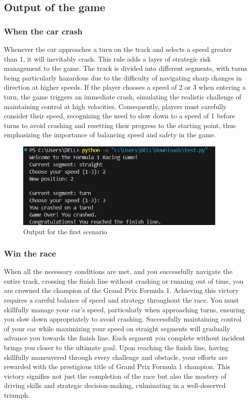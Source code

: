 \documentclass[12pt]{article}
\begin{document}
\subsection{Output of the game}
\subsubsection{When the car crash}
Whenever the car approaches a turn on the track and selects a speed greater than 1, it will inevitably crash. This rule adds a layer of strategic risk management to the game. The track is divided into different segments, with turns being particularly hazardous due to the difficulty of navigating sharp changes in direction at higher speeds. If the player chooses a speed of 2 or 3 when entering a turn, the game triggers an immediate crash, simulating the realistic challenge of maintaining control at high velocities. Consequently, players must carefully consider their speed, recognizing the need to slow down to a speed of 1 before turns to avoid crashing and resetting their progress to the starting point, thus emphasizing the importance of balancing speed and safety in the game.

\begin{figure}[h!]
\begin{center}
\includegraphics[width=10.5cm]{output1.png}\\
Output for the first scenario
\end{center}
\end{figure}

\subsubsection{Win the race}
When all the necessary conditions are met, and you successfully navigate the entire track, crossing the finish line without crashing or running out of time, you are crowned the champion of the Grand Prix Formula 1. Achieving this victory requires a careful balance of speed and strategy throughout the race. You must skillfully manage your car's speed, particularly when approaching turns, ensuring you slow down appropriately to avoid crashing. Successfully maintaining control of your car while maximizing your speed on straight segments will gradually advance you towards the finish line. Each segment you complete without incident brings you closer to the ultimate goal. Upon reaching the finish line, having skillfully maneuvered through every challenge and obstacle, your efforts are rewarded with the prestigious title of Grand Prix Formula 1 champion. This victory signifies not just the completion of the race but also the mastery of driving skills and strategic decision-making, culminating in a well-deserved triumph.
\end{document}
